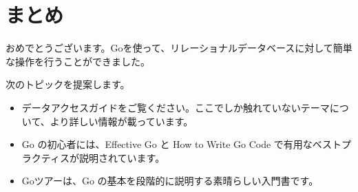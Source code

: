 \section{まとめ}

おめでとうございます。Goを使って、リレーショナルデータベースに対して簡単な操作を行うことができました。

次のトピックを提案します。

\begin{itemize}
\item
  データアクセスガイドをご覧ください。ここでしか触れていないテーマについて、より詳しい情報が載っています。
\item
  Go の初心者には、Effective Go と How to Write Go Code
  で有用なベストプラクティスが説明されています。
\item
  Goツアーは、Go の基本を段階的に説明する素晴らしい入門書です。
\end{itemize}

